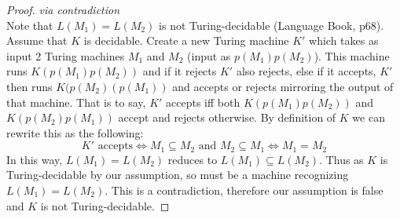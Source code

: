 \documentclass[12pt]{jhwhw}
\begin{document}
	\bigbreak
	\begin{proof} \textit{via contradiction} \\
		Note that $L(M_1) = L(M_2)$ is not Turing-decidable (Language Book, p68). \\
		Assume that $K$ is decidable. Create a new Turing machine $K'$ which takes
		as input 2 Turing machines $M_1$ and $M_2$ (input as $p(M_1)p(M_2)$). 
		This machine runs $K(p(M_1)p(M_2))$ and
		if it rejects $K'$ also rejects, else if it accepts, $K'$ then runs $K(p(M_2)(p(M_1))$ and
		accepts or rejects mirroring the output of that machine. That is to say, $K'$ accepts iff
		both $K(p(M_1)p(M_2))$ and $K(p(M_2)p(M_1))$ accept and rejects otherwise. By definition
		of $K$ we can rewrite this as the following:
		$$
			K' \text{ accepts} \Leftrightarrow M_1 \subseteq M_2 \text{ and } M_2 \subseteq M_1 \Leftrightarrow M_1 = M_2
		$$
		In this way, $L(M_1) = L(M_2)$ reduces to $L(M_1) \subseteq L(M_2)$. Thus as $K$ is Turing-decidable
		by our assumption, so must be a machine recognizing $L(M_1) = L(M_2)$. This is a contradiction,
		therefore our assumption is false and $K$ is not Turing-decidable.
	\end{proof}
\end{document}
